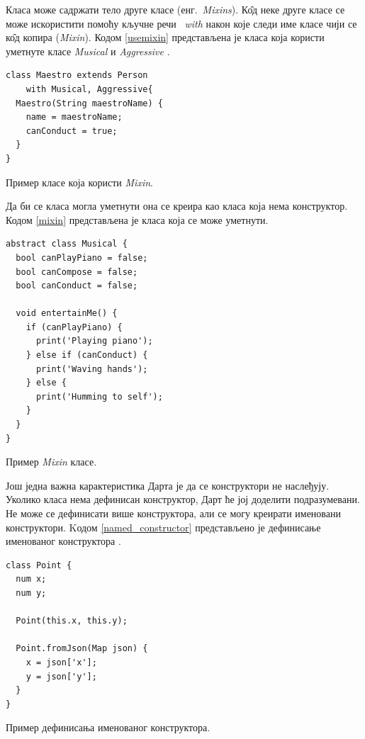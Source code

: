 \documentclass[12pt,oneside]{memoir}
\begin{document}
Класа може садржати тело друге класе (енг.~\textit{Mixins}). К\^{о}д неке друге класе се може искористити помоћу кључне речи ~\textit{with} након које следи име класе чији се к\^{о}д копира (\textit{Mixin}). Кодом \ref{usemixin} представљена је класа која користи уметнуте класе \textit{Musical} и \textit{Aggressive} \cite{dart, dart1}.

\begin{listing}
\begin{verbatim}
class Maestro extends Person
    with Musical, Aggressive{
  Maestro(String maestroName) {
    name = maestroName;
    canConduct = true;
  }
}
\end{verbatim}
\caption{Пример класе која користи \textit{Mixin}.}
\label{usemixin}
\end{listing}

Да би се класа могла уметнути она се креира као класа која нема конструктор. Кодом \ref{mixin} представљена је класа која се може уметнути.

\begin{listing}
\begin{verbatim}
abstract class Musical {
  bool canPlayPiano = false;
  bool canCompose = false;
  bool canConduct = false;

  void entertainMe() {
    if (canPlayPiano) {
      print('Playing piano');
    } else if (canConduct) {
      print('Waving hands');
    } else {
      print('Humming to self');
    }
  }
}
\end{verbatim}
\caption{Пример \textit{Mixin} класе.}
\label{mixin}
\end{listing}

Још једна важна карактеристика Дарта је да се конструктори не наслеђују. Уколико класа нема дефинисан конструктор, Дарт ће јој доделити подразумевани. Не може се дефинисати више конструктора, али се могу креирати именовани конструктори. Kодом \ref{named_constructor} представљено је дефинисање именованог конструктора \cite{dart, dart1}.
\begin{listing}
\begin{verbatim}
class Point {
  num x;
  num y;

  Point(this.x, this.y);

  Point.fromJson(Map json) {
    x = json['x'];
    y = json['y'];
  }
}
\end{verbatim}
\caption{Пример дефинисања именованог конструктора.}
\label{named_constructor}
\end{listing}
\end{document}
